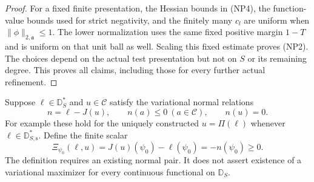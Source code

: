 \begin{proof}
For a fixed finite presentation, the Hessian bounds in
\textup{(NP4)}, the function-value bounds used for
strict negativity, and the finitely many $c_l$ are
uniform when $\|\phi\|_{2,\mathfrak a}\le1$.
The lower normalization uses the same fixed positive
margin $1-T$ and is uniform on that unit ball as well.
Scaling this fixed estimate proves \textup{(NP2)}.
The choices depend on the actual test presentation but
not on $S$ or its remaining degree.  This proves all
claims, including those for every further actual refinement.
\end{proof}

\begin{definition}
Suppose $\ell\in\mathbb D_S^*$ and $u\in\mathscr C$
satisfy the variational normal relations
\[
 n=\ell-J(u),\qquad n(a)\le0\ (a\in\mathscr C),
                       \qquad n(u)=0.
 \tag{NP6}
\]
For example these hold for the uniquely constructed
$u=\Pi(\ell)$ whenever $\ell\in\mathbb D_{S,\mathrm s}^*$.
Define the finite scalar
\[
        \Xi_{\psi_0}(\ell,u)
                   =J(u)(\psi_0)-\ell(\psi_0)=-n(\psi_0)\ge0.
 \tag{NP7}
\]
The definition requires an existing normal pair.  It
does not assert existence of a variational maximizer for
every continuous functional on $\mathbb D_S$.
\end{definition}

